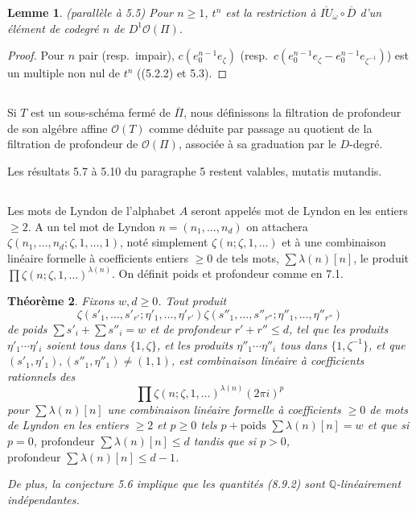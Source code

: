 \documentclass[11pt,a4paper]{article}
\theoremstyle{plain}
\newtheorem{theorem}{Th\'eor\`eme}[section]
\newtheorem{lemma}[theorem]{Lemme}
\theoremstyle{definition}
\newcommand{\Q}{\mathbb{Q}}
\begin{document}
\begin{lemma}\label{lem:8.6} (parall\`ele \`a 5.5)
Pour $n \geq 1$, $t^n$ est la restriction \`a $\overline{IU}_\omega \circ \overline{D}$ d'un \'el\'ement de codegr\'e $n$ de $D^1\mathcal{O}(\Pi)$.
\end{lemma}

\begin{proof}
Pour $n$ pair (resp.~impair), $c(e_0^{n-1}e_\zeta)$ (resp.~$c(e_0^{n-1}e_\zeta - e_0^{n-1}e_{\zeta^{-1}})$) est un multiple non nul de $t^n$ ((5.2.2) et 5.3).
\end{proof}

\subsection{}
Si $T$ est un sous-sch\'ema ferm\'e de $\overline{\Pi}$, nous d\'efinissons la filtration de profondeur de son alg\'ebre affine $\mathcal{O}(T)$ comme d\'eduite par passage au quotient de la filtration de profondeur de $\mathcal{O}(\Pi)$, associ\'ee \`a sa graduation par le $D$-degr\'e.

Les r\'esultats 5.7 \`a 5.10 du paragraphe 5 restent valables, mutatis mutandis.

\subsection{}
Les mots de Lyndon de l'alphabet $A$ seront appel\'es mot de Lyndon en les entiers $\geq 2$. A un tel mot de Lyndon $n = (n_1,\ldots,n_d)$ on attachera $\zeta(n_1,\ldots,n_d; \zeta, 1,\ldots,1)$, not\'e simplement $\zeta(n; \zeta, 1, \ldots)$ et \`a une combinaison lin\'eaire formelle \`a coefficients entiers $\geq 0$ de tels mots, $\sum \lambda(n)[n]$, le produit $\prod \zeta(n; \zeta, 1, \ldots)^{\lambda(n)}$. On d\'efinit poids et profondeur comme en 7.1.

\begin{theorem}\label{thm:8.9}
Fixons $w, d \geq 0$. Tout produit
\begin{equation}\label{eq:8.9.1}
\zeta(s'_1,\ldots,s'_{r'}; \eta'_1,\ldots,\eta'_{r'}) \zeta(s''_1,\ldots,s''_{r''}; \eta''_1,\ldots,\eta''_{r''})
\end{equation}
de poids $\sum s'_i + \sum s''_i = w$ et de profondeur $r' + r'' \leq d$, tel que les produits $\eta'_1 \cdots \eta'_i$ soient tous dans $\{1, \zeta\}$, et les produits $\eta''_1 \cdots \eta''_i$ tous dans $\{1, \zeta^{-1}\}$, et que $(s'_1, \eta'_1), (s''_1, \eta''_1) \neq (1,1)$, est combinaison lin\'eaire \`a coefficients rationnels des
\begin{equation}\label{eq:8.9.2}
\prod \zeta(n; \zeta, 1, \ldots)^{\lambda(n)} (2\pi i)^p
\end{equation}
pour $\sum \lambda(n)[n]$ une combinaison lin\'eaire formelle \`a coefficients $\geq 0$ de mots de Lyndon en les entiers $\geq 2$ et $p \geq 0$ tels $p + \text{poids } \sum \lambda(n)[n] = w$ et que si $p=0$, $\text{profondeur } \sum \lambda(n)[n] \leq d$ tandis que si $p > 0$, $\text{profondeur } \sum \lambda(n)[n] \leq d-1$.

De plus, la conjecture 5.6 implique que les quantit\'es (8.9.2) sont $\Q$-lin\'eairement ind\'ependantes.
\end{theorem}
\end{document}
